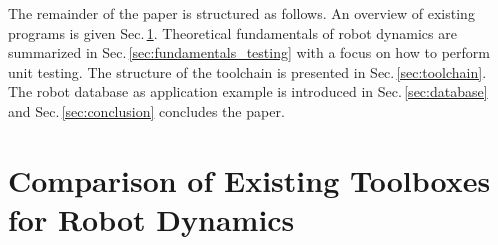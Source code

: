 \documentclass[runningheads]{llncs}
\begin{document}
The remainder of the paper is structured as follows.
An overview of existing programs is given Sec.\,\ref{sec:comparison}.
Theoretical fundamentals of robot dynamics are summarized in Sec.\,\ref{sec:fundamentals_testing} with a focus on how to perform unit testing.
The structure of the toolchain is presented in Sec.\,\ref{sec:toolchain}. %
The robot database as application example is introduced in Sec.\,\ref{sec:database} and Sec.\,\ref{sec:conclusion} concludes the paper.



\section{Comparison of Existing Toolboxes for Robot Dynamics}
\label{sec:comparison}

\newcommand{\tabnote}[1]{\refstepcounter{definition}} %
\end{document}

